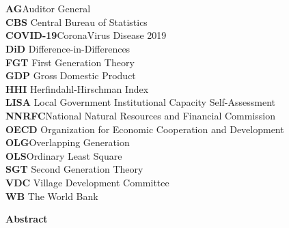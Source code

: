 \section*{}
\textbf{AG}\hspace{32mm}Auditor General\\
\textbf{CBS}\hspace{28mm} Central Bureau of Statistics\\
\textbf{COVID-19}\hspace{16mm}CoronaVirus Disease 2019\\
\textbf{DiD}\hspace{29mm} Difference-in-Differences\\
\textbf{FGT}\hspace{28mm} First Generation Theory\\
\textbf{GDP}\hspace{27mm} Gross Domestic Product\\
\textbf{HHI}\hspace{27mm} Herfindahl-Hirschman Index\\
\textbf{LISA}\hspace{27mm} Local Government Institutional Capacity Self-Assessment\\ 
\textbf{NNRFC}\hspace{21mm}National Natural Resources and Financial Commission\\
\textbf{OECD}\hspace{23mm} Organization for Economic Cooperation and Development\\
\textbf{OLG}\hspace{28mm}Overlapping Generation\\
\textbf{OLS}\hspace{29mm}Ordinary Least Square\\
\textbf{SGT}\hspace{27mm} Second Generation Theory\\
\textbf{VDC}\hspace{26mm} Village Development Committee\\
\textbf{WB}\hspace{28mm} The World Bank\\







\newpage
\begin{center}
\textbf{\large Abstract}
\end{center}
